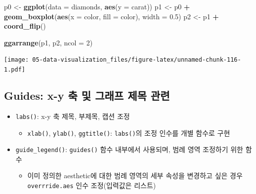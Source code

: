 \documentclass[
  11pt,
]{krantz}
\newenvironment{Shaded}{\begin{snugshade}}{\end{snugshade}}
\newcommand{\DataTypeTok}[1]{\textcolor[rgb]{0.27,0.27,0.27}{#1}}
\newcommand{\DecValTok}[1]{\textcolor[rgb]{0.06,0.06,0.06}{#1}}
\newcommand{\FloatTok}[1]{\textcolor[rgb]{0.06,0.06,0.06}{#1}}
\newcommand{\KeywordTok}[1]{\textcolor[rgb]{0.27,0.27,0.27}{\textbf{#1}}}
\newcommand{\NormalTok}[1]{#1}
\newcommand{\OperatorTok}[1]{\textcolor[rgb]{0.43,0.43,0.43}{\textbf{#1}}}
\newcommand{\StringTok}[1]{\textcolor[rgb]{0.5,0.5,0.5}{#1}}
\providecommand{\tightlist}{%
  \setlength{\itemsep}{0pt}\setlength{\parskip}{0pt}}
\begin{document}
\footnotesize

\begin{Shaded}
\begin{Highlighting}[]
\NormalTok{p0 <-}\StringTok{ }\KeywordTok{ggplot}\NormalTok{(}\DataTypeTok{data =}\NormalTok{ diamonds, }
             \KeywordTok{aes}\NormalTok{(}\DataTypeTok{y =}\NormalTok{ carat))}
\NormalTok{p1 <-}\StringTok{ }\NormalTok{p0 }\OperatorTok{+}\StringTok{ }\KeywordTok{geom_boxplot}\NormalTok{(}\KeywordTok{aes}\NormalTok{(}\DataTypeTok{x =}\NormalTok{ color, }
                   \DataTypeTok{fill =}\NormalTok{ color), }
               \DataTypeTok{width =} \FloatTok{0.5}\NormalTok{)}
\NormalTok{p2 <-}\StringTok{ }\NormalTok{p1 }\OperatorTok{+}\StringTok{ }
\StringTok{  }\KeywordTok{coord_flip}\NormalTok{()}
\end{Highlighting}
\end{Shaded}

\normalsize

\footnotesize

\begin{Shaded}
\begin{Highlighting}[]
\KeywordTok{ggarrange}\NormalTok{(p1, p2, }\DataTypeTok{ncol =} \DecValTok{2}\NormalTok{)}
\end{Highlighting}
\end{Shaded}

\texttt{[image: 05-data-visualization\_files/figure-latex/unnamed-chunk-116-1.pdf]}

\normalsize

\hypertarget{guides-x-y-uxcd95-uxbc0f-uxadf8uxb798uxd504-uxc81cuxbaa9-uxad00uxb828}{%
\subsection{Guides: x-y 축 및 그래프 제목 관련}\label{guides-x-y-uxcd95-uxbc0f-uxadf8uxb798uxd504-uxc81cuxbaa9-uxad00uxb828}}

\begin{itemize}
\tightlist
\item
  \texttt{labs()}: x-y 축 제목, 부제목, 캡션 조정

  \begin{itemize}
  \tightlist
  \item
    \texttt{xlab()}, \texttt{ylab()}, \texttt{ggtitle()}: \texttt{labs()}의 조정 인수를 개별 함수로 구현
  \end{itemize}
\item
  \texttt{guide\_legend()}: \texttt{guides()} 함수 내부에서 사용되며, 범례 영역 조정하기 위한 함수

  \begin{itemize}
  \tightlist
  \item
    이미 정의한 aesthetic에 대한 범례 영역의 세부 속성을 변경하고 싶은 경우 \texttt{overrride.aes} 인수 조정(입력값은 리스트)
  \end{itemize}
\end{itemize}
\end{document}
